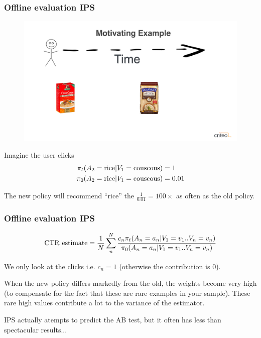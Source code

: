 \begin{frame}
  \frametitle{Offline evaluation IPS}
 
  \begin{figure}[h!]
    \includegraphics[scale=0.15]{images/rice_cous.png}
      \centering
      \label{motex1}
  \end{figure}


Imagine the user clicks
\begin{align*}
     \pi_t(A_{2}= {\rm rice} {\rm }|V_1={\rm couscous}) &= 1\\
     \pi_0(A_{2}= {\rm rice} {\rm }|V_1={\rm couscous}) &= 0.01\\
\end{align*}

The new policy will recommend ``rice'' the $\frac{1}{0.01}=100 \times$ as often as the old policy.
   
 \end{frame}


\begin{frame}
  \frametitle{Offline evaluation IPS}
 
\[
{\rm CTR ~ estimate} = \frac{1}{N} \sum_n^N \frac{c_n \pi_t(A_n=a_n|V_1=v_1..V_n=v_n)}{\pi_0(A_n=a_n|V_1=v_1..V_n=v_n)}
\]

\pause
We only look at the clicks i.e. $c_n=1$ (otherwise the contribution is $0$).

\pause

When the new policy differs markedly from the old, the weights become
very high (to compensate for the fact that these are rare examples in
your sample).  These rare high values contribute a lot to the variance
of the estimator.


\pause
IPS actually atempts to predict the AB test, but it often has less
than spectacular results...   

 \end{frame}

